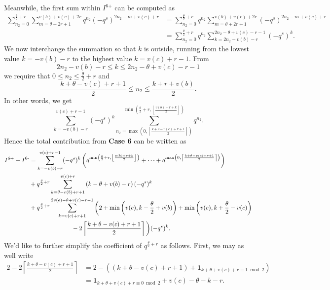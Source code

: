 Meanwhile, the first sum within $I^{\text{6+}}$ can be computed as
\begin{align*}
  \sum_{n_2 = 0}^{\frac{\theta}{2} + r}
  \sum_{m = \theta + 2r + 1}^{v(b) + v(c) + 2r}
    q^{n_2} (-q^s)^{2n_2 - m + v(c) + r}
  &= \sum_{n_2 = 0}^{\frac{\theta}{2} + r} q^{n_2}
    \sum_{m = \theta + 2r + 1}^{v(b) + v(c) + 2r}
      (-q^s)^{2n_2 - m + v(c) + r} \\
  &= \sum_{n_2 = 0}^{\frac{\theta}{2} + r} q^{n_2}
    \sum_{k = 2n_2 - v(b) - r}^{2n_2 - \theta + v(c) - r - 1} (-q^s)^k.
\end{align*}
We now interchange the summation so that $k$ is outside,
running from the lowest value $k = -v(b) - r$
to the highest value $k = v(c) + r - 1$.
From
\[ 2n_2 - v(b) - r \le k \le 2n_2 - \theta + v(c) - r - 1 \]
we require that $0 \le n_2 \le \frac{\theta}{2} + r$ and
\[ \frac{k + \theta - v(c) + r + 1}{2} \le n_2 \le \frac{k + r + v(b)}{2}. \]
In other words, we get
\[
  \sum_{k = - v(b) - r}^{v(c) + r - 1}
  (-q^s)^k
  \sum_{n_2 = \max\left(0, \left\lceil \frac{k + \theta - v(c) + r + 1}{2} \right\rceil \right)}
  ^{\min\left( \frac{\theta}{2} + r, \left\lfloor \frac{v(b) + r + k}{2} \right\rfloor \right) } q^{n_2}.
\]
Hence the total contribution from \textbf{Case 6} can be written as
\begin{align*}
  I^{\text{6+}} + I^{\text{6-}}
  &=
  \sum_{k = - v(b) - r}^{v(c) + r - 1} (-q^s)^k \left(
    q^{\min\left( \frac{\theta}{2} + r, \left\lfloor \frac{v(b) + r + k}{2} \right\rfloor \right)}
    + \dots
    + q^{\max\left(0, \left\lceil \frac{k + \theta - v(c) + r + 1}{2} \right\rceil \right)}
    \right) \\
  &+ q^{\frac{\theta}{2} + r}
  \sum_{k = \theta - v(b) + r + 1}^{v(c) + r}
  \left( k - \theta + v(b) - r \right) (-q^s)^k \\
  &+ q^{\frac{\theta}{2} + r}
  \sum_{k = v(c) + r + 1}^{2v(e) - \theta + v(c) - r - 1}
  \bigg( 2 +
    \min\left( v(e), k - \frac{\theta}{2} + v(b) \right)
    + \min\left( v(e), k + \frac{\theta}{2} - v(c) \right) \\
    &\hspace{16ex} - 2\left\lceil \frac{k + \theta - v(c) + r + 1}{2} \right\rceil \bigg) (-q^s)^k.
\end{align*}
We'd like to further simplify the coefficient of $q^{\frac{\theta}{2}+r}$ as follows.
First, we may as well write
\begin{align*}
  2 - 2\left\lceil \frac{k + \theta - v(c) + r + 1}{2} \right\rceil
  &= 2 - \left( (k + \theta - v(c) + r + 1)
  + \mathbf{1}_{k + \theta + v(c) + r \equiv 1 \bmod 2} \right) \\
  &= \mathbf{1}_{k + \theta + v(c) + r \equiv 0 \bmod 2}
  + v(c) - \theta - k - r.
\end{align*}
